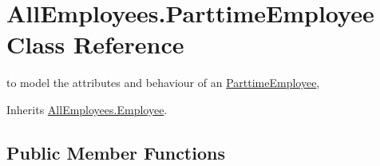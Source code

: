 \hypertarget{class_all_employees_1_1_parttime_employee}{\section{All\-Employees.\-Parttime\-Employee Class Reference}
\label{class_all_employees_1_1_parttime_employee}
}


to model the attributes and behaviour of an \hyperlink{class_all_employees_1_1_parttime_employee}{Parttime\-Employee},  




Inherits \hyperlink{class_all_employees_1_1_employee}{All\-Employees.\-Employee}.

\subsection*{Public Member Functions}
